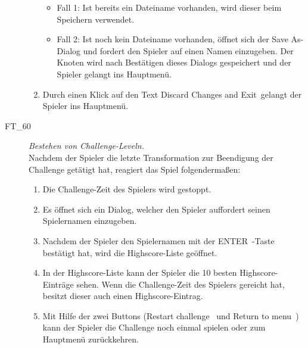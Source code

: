 \begin{description}
\begin{enumerate}
\begin{itemize}
			\item Fall 1: Ist bereits ein Dateiname vorhanden, wird dieser beim Speichern verwendet.
			
			\item Fall 2: Ist noch kein Dateiname vorhanden, öffnet sich der \glqq Save As\grqq-Dialog und fordert den Spieler auf einen Namen einzugeben. Der Knoten wird nach Bestätigen dieses Dialogs gespeichert und der Spieler gelangt ins Hauptmenü.\\
		
		\end{itemize}
		
		
		\item Durch einen Klick auf den Text \glqq Discard Changes and Exit\grqq~gelangt der Spieler ins Hauptmenü.	
		~\\	
		
	\end{enumerate}
	

	
\label{FT:60}
	
	\item[FT\_60] \textit{Bestehen von Challenge-Leveln.} \hfill\\
	
	Nachdem der Spieler die letzte Transformation zur Beendigung der Challenge getätigt hat, reagiert das Spiel folgendermaßen:
	
	\begin{enumerate} 
	
	    \item Die Challenge-Zeit des Spielers wird gestoppt.
	    
		\item Es öffnet sich ein Dialog, welcher den Spieler auffordert seinen Spielernamen einzugeben.
		
		\item Nachdem der Spieler den Spielernamen mit der \glqq ENTER\grqq~-Taste bestätigt hat, wird die Highscore-Liste geöffnet.
		
		\item In der Highscore-Liste kann der Spieler die 10 besten Highscore-Einträge sehen. Wenn die Challenge-Zeit des Spielers gereicht hat, besitzt dieser auch einen Highscore-Eintrag.
		
		\item Mit Hilfe der zwei Buttons (\glqq Restart challenge\grqq~ und \glqq Return to menu\grqq~) kann der Spieler die Challenge noch einmal spielen oder zum Hauptmenü zurückkehren.
		~\\
			

\end{enumerate}
\end{description}
